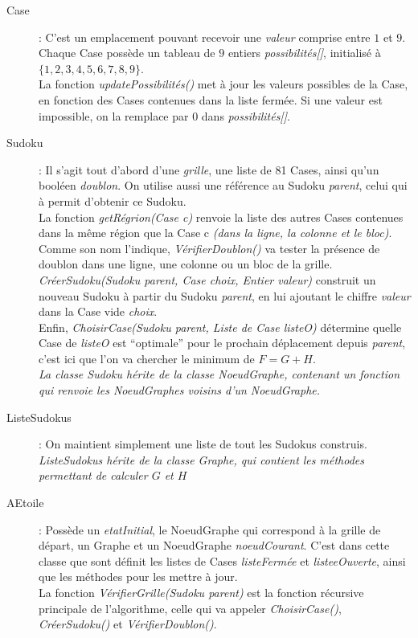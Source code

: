                 \begin{description}
                    \item[Case]: C'est un emplacement pouvant recevoir une \textit{valeur} comprise entre $1$ et $9$. Chaque Case possède un tableau de $9$ entiers \textit{possibilités[]}, initialisé à $\{1,2,3,4,5,6,7,8,9\}$.\\
                        La fonction \textit{updatePossibilités()} met à jour les valeurs possibles de la Case, en fonction des Cases contenues dans la liste fermée. Si une valeur est impossible, on la remplace par $0$ dans \textit{possibilités[]}.
                    \item[Sudoku]: Il s'agit tout d'abord d'une \textit{grille}, une liste de 81 Cases, ainsi qu'un booléen \textit{doublon}. On utilise aussi une référence au Sudoku \textit{parent}, celui qui à permit d'obtenir ce Sudoku.\\
                        La fonction \textit{getRégrion(Case c)} renvoie la liste des autres Cases contenues dans la même région que la Case c \textit{(dans la ligne, la colonne et le bloc)}.\\
                        Comme son nom l'indique, \textit{VérifierDoublon()} va tester la présence de doublon dans une ligne, une colonne ou un bloc de la grille.\\
                        \textit{CréerSudoku(Sudoku parent, Case choix, Entier valeur)} construit un nouveau Sudoku à partir du Sudoku \textit{parent}, en lui ajoutant le chiffre \textit{valeur} dans la Case vide \textit{choix}.\\
                        Enfin, \textit{ChoisirCase(Sudoku parent, Liste de Case listeO)} détermine quelle Case de \textit{listeO} est ``optimale'' pour le prochain déplacement depuis \textit{parent}, c'est ici que l'on va chercher le minimum de $F=G+H$.\\
                    \textit{La classe Sudoku hérite de la classe NoeudGraphe, contenant un fonction qui renvoie les NoeudGraphes voisins d'un NoeudGraphe.}
                        \item[ListeSudokus]: On maintient simplement une liste de tout les Sudokus construis.\\
                    \textit{ListeSudokus hérite de la classe Graphe, qui contient les méthodes permettant de calculer $G$ et $H$}
                    \item[AEtoile]: Possède un \textit{etatInitial}, le NoeudGraphe qui correspond à la grille de départ, un Graphe et un NoeudGraphe \textit{noeudCourant}. C'est dans cette classe que sont définit les listes de Cases \textit{listeFermée} et \textit{listeeOuverte}, ainsi que les méthodes pour les mettre à jour.\\
                        La fonction \textit{VérifierGrille(Sudoku parent)} est la fonction récursive principale de l'algorithme, celle qui va appeler \textit{ChoisirCase()}, \textit{CréerSudoku()} et \textit{VérifierDoublon()}.
                \end{description}
